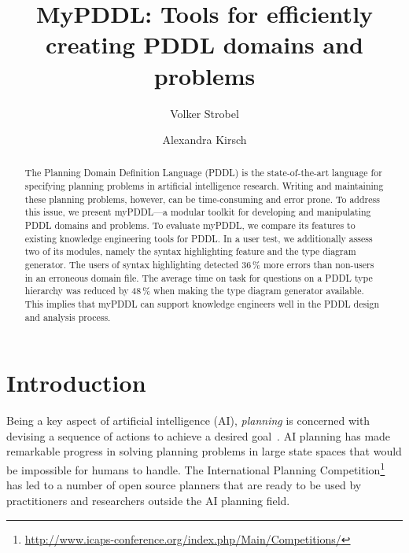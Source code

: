 \documentclass[runningheads]{llncs}
\begin{document}
%
\title{MyPDDL: Tools for efficiently creating PDDL domains and
  problems}
%
%
\author{Volker Strobel \and
Alexandra Kirsch}
%
%
%
\maketitle              %
%
\begin{abstract}
  The Planning Domain Definition Language (PDDL) is the
  state-of-the-art language for specifying planning problems in
  artificial intelligence research. Writing and maintaining these
  planning problems, however, can be time-consuming and error
  prone. To address this issue, we present myPDDL---a modular toolkit
  for developing and manipulating PDDL domains and problems. To
  evaluate myPDDL, we compare its features to existing knowledge
  engineering tools for PDDL. In a user test, we additionally assess
  two of its modules, namely the syntax highlighting feature and the
  type diagram generator. The users of syntax highlighting detected
  36\,\% more errors than non-users in an erroneous domain file. The
  average time on task for questions on a PDDL type hierarchy was
  reduced by 48\,\% when making the type diagram generator
  available. This implies that myPDDL can support knowledge engineers
  well in the PDDL design and analysis process.
  
\end{abstract}

\section{Introduction}
\label{sec:introduction}

Being a key aspect of artificial intelligence (AI), \emph{planning} is
concerned with devising a sequence of actions to achieve a desired
goal~\cite{helmert2008understanding}. AI planning has made remarkable
progress in solving planning problems in large state spaces that would
be impossible for humans to handle. The International Planning
Competition\footnote{\url{http://www.icaps-conference.org/index.php/Main/Competitions/}}
has led to a number of open source planners that are ready to be used
by practitioners and researchers outside the AI planning field.
\end{document}
